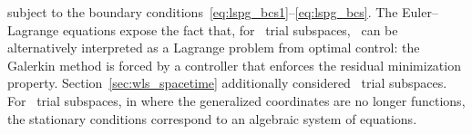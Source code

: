 subject to the boundary conditions~\eqref{eq:lspg_bcs1}--\eqref{eq:lspg_bcs}. The Euler--Lagrange equations expose the fact that, for \spatialAcronym\
trial subspaces, \methodAcronym\ can be alternatively interpreted as a Lagrange problem from optimal control: the Galerkin method is forced by a 
controller that enforces the residual minimization property. 
Section~\ref{sec:wls_spacetime} additionally considered \spaceTimeAcronym\ trial subspaces. For \spaceTimeAcronym\ trial subspaces, in where the generalized coordinates are no longer functions, the stationary conditions correspond to an algebraic system of equations.
